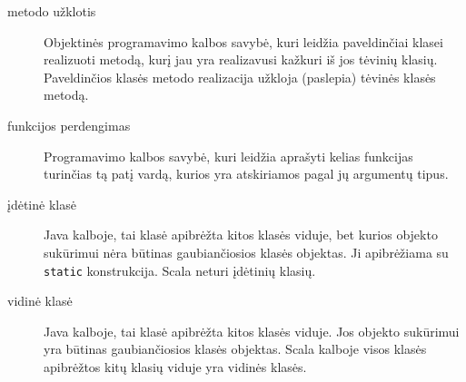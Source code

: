 \begin{description}
  \item[metodo užklotis ]
    Objektinės programavimo kalbos savybė, kuri leidžia paveldinčiai klasei
    realizuoti metodą, kurį jau yra realizavusi kažkuri iš jos tėvinių
    klasių. Paveldinčios klasės metodo realizacija užkloja (paslepia)
    tėvinės klasės metodą.

  \item[funkcijos perdengimas ]
    Programavimo kalbos savybė, kuri leidžia aprašyti kelias funkcijas
    turinčias tą patį vardą, kurios yra atskiriamos pagal jų argumentų
    tipus.

  \item[įdėtinė klasė ]
    Java kalboje, tai klasė apibrėžta kitos klasės viduje, bet
    kurios objekto sukūrimui nėra būtinas gaubiančiosios
    klasės objektas. Ji apibrėžiama su \verb|static| konstrukcija.
    Scala neturi įdėtinių klasių.

  \item[vidinė klasė ]
    Java kalboje, tai klasė apibrėžta kitos klasės viduje. Jos
    objekto sukūrimui yra būtinas gaubiančiosios klasės objektas.
    Scala kalboje visos klasės apibrėžtos kitų klasių viduje
    yra vidinės klasės.

\end{description}
